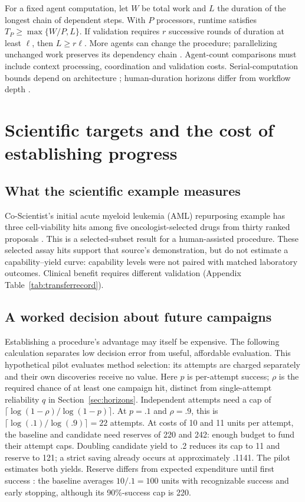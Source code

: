 For a fixed agent computation, let $W$ be total work and $L$ the duration of the longest chain of dependent steps. With $P$ processors, runtime satisfies $T_P\ge\max\{W/P,L\}$. If validation requires $r$ successive rounds of duration at least $\ell$, then $L\ge r\ell$. More agents can change the procedure; parallelizing unchanged work preserves its dependency chain \citep{meyerson2025,shun2024parallel,kim2026agents}. Agent-count comparisons must include context processing, coordination and validation costs. Serial-computation bounds depend on architecture \citep{liu2026serial}; human-duration horizons differ from workflow depth \citep{liu2026bridge}.

\section{Scientific targets and the cost of establishing progress}
\label{sec:tests}
\subsection{What the scientific example measures}
Co-Scientist's initial acute myeloid leukemia (AML) repurposing example has three cell-viability hits among five oncologist-selected drugs from thirty ranked proposals \citep{gottweis2026coscientist}. This is a selected-subset result for a human-assisted procedure. These selected assay hits support that source's demonstration, but do not estimate a capability--yield curve: capability levels were not paired with matched laboratory outcomes. Clinical benefit requires different validation (Appendix Table~\ref{tab:transferrecord}).

\subsection{A worked decision about future campaigns}
Establishing a procedure's advantage may itself be expensive. The following calculation separates low decision error from useful, affordable evaluation. This hypothetical pilot evaluates method selection: its attempts are charged separately and their own discoveries receive no value. Here $p$ is per-attempt success; $\rho$ is the required chance of at least one campaign hit, distinct from single-attempt reliability $q$ in Section~\ref{sec:horizons}. Independent attempts need a cap of $\lceil\log(1-\rho)/\log(1-p)\rceil$. At $p=.1$ and $\rho=.9$, this is $\lceil\log(.1)/\log(.9)\rceil=22$ attempts. At costs of 10 and 11 units per attempt, the baseline and candidate need reserves of 220 and 242: enough budget to fund their attempt caps. Doubling candidate yield to .2 reduces its cap to 11 and reserve to 121; a strict saving already occurs at approximately .1141. The pilot estimates both yields. Reserve differs from expected expenditure until first success \citep{erol2026costofpass}: the baseline averages $10/.1=100$ units with recognizable success and early stopping, although its 90\%-success cap is 220.

